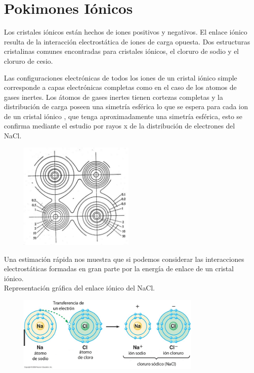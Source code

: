 \documentclass{article}
\begin{document}
\newpage

\section{Pokimones Iónicos}

Los cristales iónicos están hechos de iones positivos y negativos. El enlace iónico resulta de la interacción electrostática  de iones de carga opuesta. Dos estructuras cristalinas comunes encontradas para cristales iónicos, el cloruro de sodio  y el cloruro de cesio.

Las configuraciones electrónicas de todos los iones de un cristal iónico simple corresponde a capas electrónicas completas como en el caso de los atomos de gases inertes. Los átomos de gases inertes tienen cortezas completas y la distribución de carga poseen una simetría esférica lo que se espera para cada ion de un cristal iónico , que tenga aproximadamente una simetría esférica, esto se confirma mediante el estudio por rayos x  de la distribución de electrones del NaCl.

\begin{figure}[h]
\centering
\includegraphics[width=0.5\textwidth]{a6.png}
\caption{}
\end{figure}

Una estimación rápida  nos muestra que si podemos considerar las interacciones electrostáticas formadas en gran parte por la energía de enlace de un cristal iónico.\\

Representación gráfica del enlace iónico del NaCl.

\begin{figure}[h]
\centering
\includegraphics[width=0.8\textwidth]{a11.png}
\caption{}
\end{figure}
\end{document}
